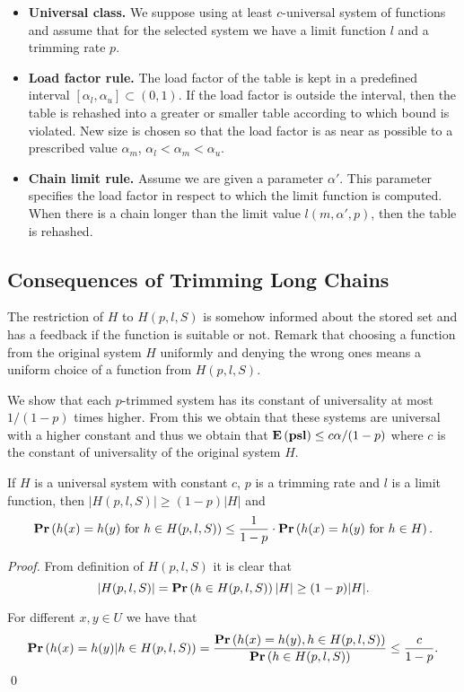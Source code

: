 \begin{itemize}
\item \textbf{Universal class.} We suppose using at least $c$-universal system of functions and assume that for the selected system we have a limit function $l$ and a trimming rate $p$.

\item \textbf{Load factor rule.} The load factor of the table is kept in a predefined interval $[\alpha_l, \alpha_u] \subset (0, 1)$. If the load factor is outside the interval, then the table is rehashed into a greater or smaller table according to which bound is violated. New size is chosen so that the load factor is as near as possible to a prescribed value $\alpha_m$, $\alpha_l < \alpha_m < \alpha_u$. 

\item \textbf{Chain limit rule.} Assume we are given a parameter $\alpha'$. This parameter specifies the load factor in respect to which the limit function is computed. When there is a chain longer than the limit value $l(m, \alpha', p)$, then the table is rehashed.
\end{itemize}

\subsection{Consequences of Trimming Long Chains}
The restriction of $H$ to $H(p, l, S)$ is somehow informed about the stored set and has a feedback if the function is suitable or not. Remark that choosing a function from the original system $H$ uniformly and denying the wrong ones means a uniform choice of a function from $H(p, l, S)$.

We show that each $p$-trimmed system has its constant of universality at most $1 / (1 - p)$ times higher. From this we obtain that these systems are universal with a higher constant and thus we obtain that $\mathbf{E}\left(\mathbf{psl}\right) \leq c\alpha/(1-p)$ where $c$ is the constant of universality of the original system $H$.

\begin{lemma}
\label{lemma-trimmed-system}
If $H$ is a universal system with constant $c$, $p$ is a trimming rate and $l$ is a limit function, then $|H(p, l, S)| \geq (1 - p)|H|$ and  \[ \mathbf{Pr}\left(h(x) = h(y) \mbox{ for } h \in H(p, l, S)\right) \leq \frac{1}{1 - p} \cdot \mathbf{Pr}\left(h(x) = h(y) \mbox{ for } h \in H\right). \]
\end{lemma}
\begin{proof}
From definition of $H(p, l, S)$ it is clear that \[|H(p, l, S)| = \mathbf{Pr}\left(h \in H(p, l, S)\right)|H| \geq (1 - p)|H|.\]

For different $x, y \in U$ we have that
\[\mathbf{Pr}\left(h(x) = h(y) | h \in H(p, l, S)\right) = \frac{\mathbf{Pr}\left(h(x) = h(y), h \in H(p, l, S)\right)}{\mathbf{Pr}\left(h \in H(p, l, S)\right)} \leq \frac{c}{1 - p}.\]
\qed
\end{proof}

